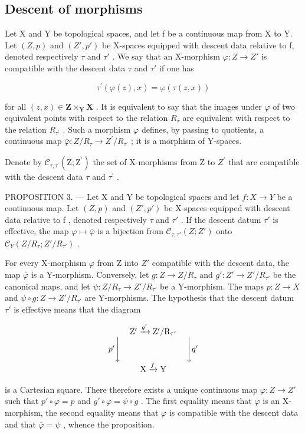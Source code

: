 \subsection{Descent of morphisms}

Let X and Y be topological spaces, and let f be a continuous map from X to Y. Let \((Z,p)\) and \((Z',p')\) be X-spaces equipped with descent data relative to f, denoted respectively \(\tau\) and \(\tau'\) . We say that an X-morphism \(\varphi\colon Z\to Z'\) is compatible with the descent data \(\tau\) and \(\tau'\) if one has

\[
\tau^ {\prime} (\varphi (z), x) = \varphi (\tau (z, x))
\]

for all \((z,x)\in\mathbf{Z}\times_{\mathbf{Y}}\mathbf{X}\) . It is equivalent to say that the images under \(\varphi\) of two equivalent points with respect to the relation \(R_{\tau}\) are equivalent with respect to the relation \(R_{\tau^{\prime}}\) . Such a morphism \(\varphi\) defines, by passing to quotients, a continuous map \(\overline{\varphi}:Z/R_{\tau}\to Z^{\prime}/R_{\tau^{\prime}}\) ; it is a morphism of Y-spaces.

Denote by \(\mathcal{C}_{\tau,\tau^{\prime}}(\mathrm{Z};\mathrm{Z}^{\prime})\) the set of X-morphisms from Z to \(Z^{\prime}\) that are compatible with the descent data \(\tau\) and \(\tau^{\prime}\) .

PROPOSITION 3. --- Let X and Y be topological spaces and let \(f\colon X \to Y\) be a continuous map. Let \((Z,p)\) and \((Z',p')\) be X-spaces equipped with descent data relative to f , denoted respectively \(\tau\) and \(\tau'\) . If the descent datum \(\tau'\) is effective, the map \(\varphi \mapsto \overline{\varphi}\) is a bijection from \(\mathcal{C}_{\tau,\tau'}(Z;Z')\) onto \(\mathcal{C}_Y(Z/R_\tau;Z'/R_{\tau'})\) .

For every X-morphism \(\varphi\) from Z into \(Z'\) compatible with the descent data, the map \(\overline{\varphi}\) is a Y-morphism. Conversely, let \(g\colon Z\to Z/R_{\tau}\) and \(g'\colon Z'\to Z'/R_{\tau'}\) be the canonical maps, and let \(\psi\colon Z/R_{\tau}\to Z'/R_{\tau'}\) be a Y-morphism. The maps \(p\colon Z\to X\) and \(\psi\circ g\colon Z\to Z'/R_{\tau'}\) are Y-morphisms. The hypothesis that the descent datum \(\tau'\) is effective means that the diagram

\[
\begin{array}{c} \mathrm {Z^ {\prime}} \xrightarrow {g ^ {\prime}} \mathrm {Z}^ {\prime} / \mathrm {R}_ {\tau^ {\prime}} \\ p ^ {\prime} \Biggl \downarrow \qquad \qquad \qquad \qquad \Biggl \downarrow q ^ {\prime} \\ \mathrm{X} \xrightarrow {f} \mathrm{Y} \end{array}
\]

is a Cartesian square. There therefore exists a unique continuous map \(\varphi\colon Z\to Z'\) such that \(p'\circ\varphi=p\) and \(g'\circ\varphi=\psi\circ g\) . The first equality means that \(\varphi\) is an X-morphism, the second equality means that \(\varphi\) is compatible with the descent data and that \(\overline{\varphi}=\psi\) , whence the proposition.

